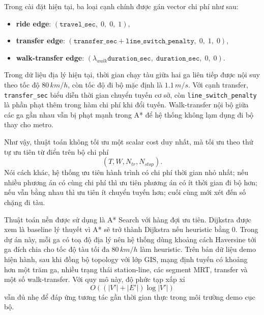 \documentclass[../DoAn.tex]{subfiles}
\begin{document}
Trong cài đặt hiện tại, ba loại cạnh chính được gán vector chi phí như sau:
\begin{itemize}
    \item \textbf{ride edge}: $(\texttt{travel\_sec},\; 0,\; 0,\; 1)$,
    \item \textbf{transfer edge}: $(\texttt{transfer\_sec} + \texttt{line\_switch\_penalty},\; 0,\; 1,\; 0)$,
    \item \textbf{walk-transfer edge}: $(\lambda_{walk}\texttt{duration\_sec},\; \texttt{duration\_sec},\; 0,\; 0)$.
\end{itemize}
Trong dữ liệu địa lý hiện tại, thời gian chạy tàu giữa hai ga liên tiếp được nội suy theo tốc độ \(80\,km/h\), còn tốc độ đi bộ mặc định là \(1.1\,m/s\). Với cạnh transfer, \texttt{transfer\_sec} biểu diễn thời gian chuyển tuyến cơ sở, còn \texttt{line\_switch\_penalty} là phần phạt thêm trong hàm chi phí khi đổi tuyến. Walk-transfer nội bộ giữa các ga gần nhau vẫn bị phạt mạnh trong A* để hệ thống không lạm dụng đi bộ thay cho metro.

Như vậy, thuật toán không tối ưu một scalar cost duy nhất, mà tối ưu theo thứ tự ưu tiên từ điển trên bộ chi phí
\[
(T, W, N_{tr}, N_{stop}).
\]
Nói cách khác, hệ thống ưu tiên hành trình có chi phí thời gian nhỏ nhất; nếu nhiều phương án có cùng chi phí thì ưu tiên phương án có ít thời gian đi bộ hơn; nếu vẫn bằng nhau thì ưu tiên ít chuyển tuyến hơn; cuối cùng mới xét đến số chặng đi tàu.

Thuật toán nền được sử dụng là A* Search với hàng đợi ưu tiên. Dijkstra được xem là baseline lý thuyết vì A* sẽ trở thành Dijkstra nếu heuristic bằng 0. Trong dự án này, mỗi ga có toạ độ địa lý nên hệ thống dùng khoảng cách Haversine tới ga đích chia cho tốc độ tàu tối đa \(80\,km/h\) làm heuristic. Trên bản dữ liệu demo hiện hành, sau khi đồng bộ topology với lớp GIS, mạng định tuyến có khoảng hơn một trăm ga, nhiều trạng thái station-line, các segment MRT, transfer và một số walk-transfer. Với quy mô này, độ phức tạp xấp xỉ
\[
O((|V'| + |E'|)\log |V'|)
\]
vẫn đủ nhẹ để đáp ứng tương tác gần thời gian thực trong môi trường demo cục bộ.
\end{document}
